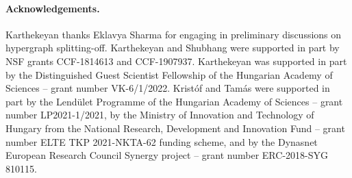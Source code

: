\medskip
\paragraph{Acknowledgements.} 
Karthekeyan thanks Eklavya Sharma for engaging in preliminary discussions on hypergraph splitting-off. 
Karthekeyan and Shubhang were supported in part by NSF grants CCF-1814613 and CCF-1907937. 
Karthekeyan was supported in part by the Distinguished Guest Scientist Fellowship of the Hungarian Academy of Sciences -- grant number VK-6/1/2022. 
Krist\'{o}f and Tam\'{a}s were supported in part 
by the Lend\"ulet Programme of the Hungarian Academy of Sciences -- grant number LP2021-1/2021, by the Ministry of Innovation and Technology of Hungary from the National Research, Development and Innovation Fund -- grant number ELTE TKP 2021-NKTA-62 funding scheme, and by the Dynasnet European Research Council Synergy project -- grant number ERC-2018-SYG 810115.